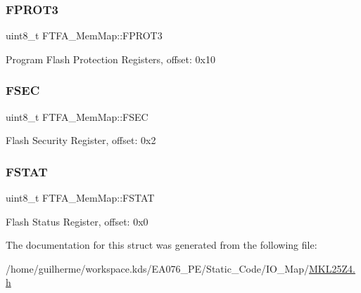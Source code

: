 \subsubsection{\texorpdfstring{F\+P\+R\+O\+T3}{FPROT3}}
{\footnotesize\ttfamily uint8\+\_\+t F\+T\+F\+A\+\_\+\+Mem\+Map\+::\+F\+P\+R\+O\+T3}

Program Flash Protection Registers, offset\+: 0x10 \mbox{\label{struct_f_t_f_a___mem_map_a9595f5c1181b22cc6411876706f38409}} 
\subsubsection{\texorpdfstring{F\+S\+EC}{FSEC}}
{\footnotesize\ttfamily uint8\+\_\+t F\+T\+F\+A\+\_\+\+Mem\+Map\+::\+F\+S\+EC}

Flash Security Register, offset\+: 0x2 \mbox{\label{struct_f_t_f_a___mem_map_ad0320d81996a5bd9b58e1d4421afc8c1}} 
\subsubsection{\texorpdfstring{F\+S\+T\+AT}{FSTAT}}
{\footnotesize\ttfamily uint8\+\_\+t F\+T\+F\+A\+\_\+\+Mem\+Map\+::\+F\+S\+T\+AT}

Flash Status Register, offset\+: 0x0 

The documentation for this struct was generated from the following file\+:\begin{DoxyCompactItemize}
\item 
/home/guilherme/workspace.\+kds/\+E\+A076\+\_\+\+P\+E/\+Static\+\_\+\+Code/\+I\+O\+\_\+\+Map/\hyperlink{_m_k_l25_z4_8h}{M\+K\+L25\+Z4.\+h}\end{DoxyCompactItemize}
